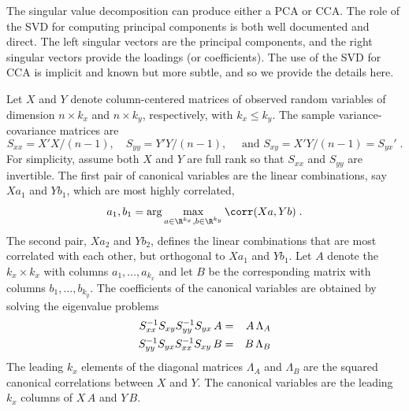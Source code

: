 \documentclass[12pt]{article}
\begin{document}
 The singular value decomposition can produce either a
 PCA or CCA.  The role of the SVD for computing principal components is both
 well documented and direct.  The left singular vectors are the principal
 components, and the right singular vectors provide the loadings (or coefficients).  The use of
 the SVD for CCA is implicit and known \citep[e.g.][]{fosterkakade07} but more
 subtle, and so we provide the details here.

 Let $X$ and $Y$ denote column-centered matrices of observed random
 variables of dimension $n \times k_x$ and $n \times k_y$, respectively, with
 $k_x \le k_y$. The sample variance-covariance matrices are
 \begin{displaymath}
   S_{xx} = X'X/(n-1),\quad S_{yy} = Y'Y/(n-1), \quad \mbox{ and }
   S_{xy} = X'Y/(n-1) = S_{yx}' \;.
 \end{displaymath}
 For simplicity, assume both $X$ and $Y$ are full rank so that $S_{xx}$ and
 $S_{yy}$ are invertible.  The first pair of canonical variables are the linear
 combinations, say $X a_1$ and $Y b_1$, which are most highly correlated,
 \begin{displaymath}
   a_1, b_1 = \arg \max_{a \in \R^{k_x},b \in \R^{k_y}} \corr(Xa,Yb) \;.
 \end{displaymath}
 The second pair, $X a_2$ and $Y b_2$, defines the linear combinations that are
 most correlated with each other, but orthogonal to $Xa_1$ and $Yb_1$.  Let $A$
 denote the $k_x \times k_x$ with columns $a_1,\ldots,a_{k_x}$ and let $B$ be
 the corresponding matrix with columns $b_1,\ldots,b_{k_y}$.  The coefficients of
 the canonical variables are obtained by solving the eigenvalue problems
 \begin{eqnarray}
   S_{xx}^{-1} S_{xy} S_{yy}^{-1} S_{yx} \, A &=& A \, \Lambda_A \cr
   S_{yy}^{-1} S_{yx} S_{xx}^{-1} S_{xy} \, B &=& B \, \Lambda_B      
 \label{eq:appA}
 \end{eqnarray}
 The leading $k_x$ elements of the diagonal matrices $\Lambda_A$ and $\Lambda_B$
 are the squared canonical correlations between $X$ and $Y$.  The canonical
 variables are the leading $k_x$ columns of $X\,A$ and $Y\,B$.
\end{document}
